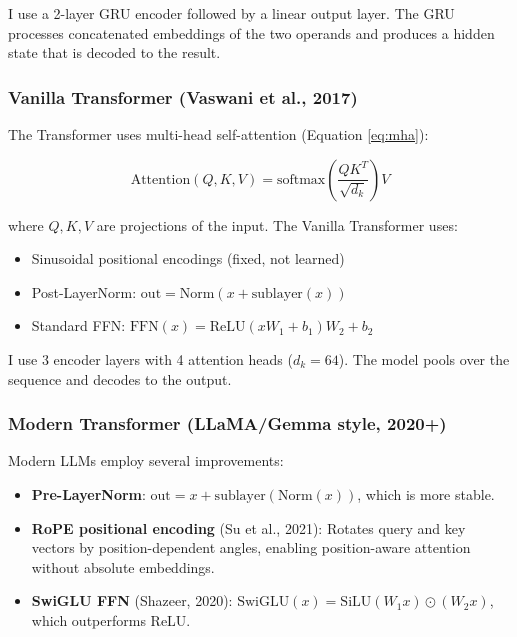 \documentclass[11pt]{article}
\begin{document}
I use a 2-layer GRU encoder followed by a linear output layer. The GRU processes concatenated embeddings of the two operands and produces a hidden state that is decoded to the result.

\subsubsection{Vanilla Transformer (Vaswani et al., 2017)}

The Transformer uses multi-head self-attention\cite{Vaswani2017} (Equation \ref{eq:mha}):

\begin{equation}
\label{eq:mha}
\text{Attention}(Q, K, V) = \text{softmax}\left(\frac{QK^T}{\sqrt{d_k}}\right)V
\end{equation}

where $Q, K, V$ are projections of the input. The Vanilla Transformer uses:
\begin{itemize}
    \item Sinusoidal positional encodings (fixed, not learned)
    \item Post-LayerNorm: $\text{out} = \text{Norm}(x + \text{sublayer}(x))$
    \item Standard FFN: $\text{FFN}(x) = \text{ReLU}(xW_1 + b_1)W_2 + b_2$
\end{itemize}

I use 3 encoder layers with 4 attention heads ($d_k = 64$). The model pools over the sequence and decodes to the output.

\subsubsection{Modern Transformer (LLaMA/Gemma style, 2020+)}

Modern LLMs employ several improvements:

\begin{itemize}
    \item \textbf{Pre-LayerNorm}: $\text{out} = x + \text{sublayer}(\text{Norm}(x))$, which is more stable.
    \item \textbf{RoPE positional encoding} (Su et al., 2021): Rotates query and key vectors by position-dependent angles, enabling position-aware attention without absolute embeddings\cite{Su2021}.
    \item \textbf{SwiGLU FFN} (Shazeer, 2020): $\text{SwiGLU}(x) = \text{SiLU}(W_1 x) \odot (W_2 x)$, which outperforms ReLU\cite{Shazeer2020}.
\end{itemize}
\end{document}
